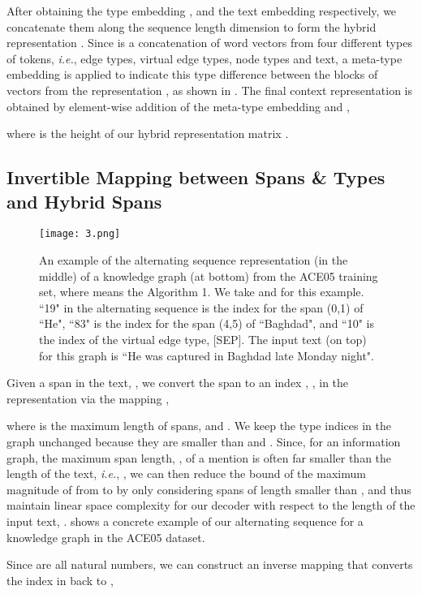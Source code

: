 \documentclass[11pt,a4paper]{article}
\begin{document}
After obtaining the type embedding , and the text embedding  respectively, we concatenate them along the sequence length dimension to form the hybrid representation . Since  is a concatenation of word vectors from four different types of tokens, \emph{i.e.}, edge types, virtual edge types, node types and text, a meta-type embedding is applied
 to indicate this type difference between the blocks of vectors from the representation , as shown in . The final context representation  is obtained by element-wise addition of the meta-type embedding and ,

where  is the height of our hybrid representation matrix .




 \subsection{Invertible Mapping between Spans \& Types and Hybrid Spans}\label{map}

\begin{figure}[t]
\centering
\texttt{[image: 3.png]}
\caption{An example of the alternating sequence representation (in the middle) of a knowledge graph (at bottom) from the ACE05 training set, where  means the Algorithm 1. We take  and  for this example. ``19" in the alternating sequence is the index for the span (0,1) of ``He", ``83" is the index for the span (4,5) of ``Baghdad", and  ``10" is the index of the virtual edge type, [SEP]. The input text (on top) for this graph is ``He was captured in Baghdad late Monday night".}\label{f4}
\end{figure}

Given a span in the text, , we convert the span  to an index , , in the representation  via the mapping ,

where  is the maximum length of spans, and . We keep the type indices in the graph unchanged because they are smaller than  and . Since, for an information graph, the maximum span length, , of a mention is often far smaller than the length of the text, \emph{i.e.}, , we can then reduce the bound of the maximum magnitude of  from  to  by only considering spans of length smaller than , and thus maintain  linear space complexity for our decoder with respect to the length of the input text, .  shows a concrete example of our alternating sequence for a knowledge graph in the ACE05 dataset.




Since  are all natural numbers, we can construct an inverse mapping  that converts the index  in  back to ,
\end{document}
